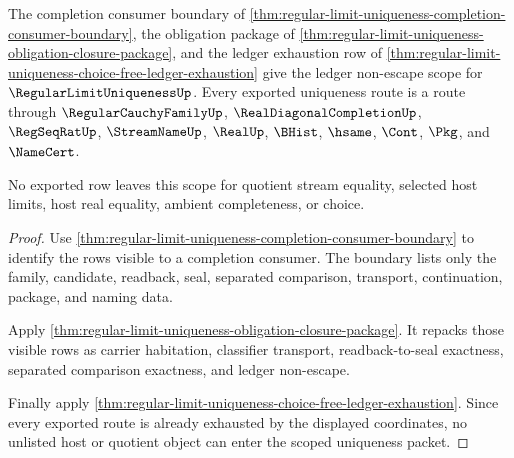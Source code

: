 \begin{theorem}
\label{thm:regular-limit-uniqueness-ledger-non-escape-scope}
The completion consumer boundary of \autoref{thm:regular-limit-uniqueness-completion-consumer-boundary}, the obligation package of \autoref{thm:regular-limit-uniqueness-obligation-closure-package}, and the ledger exhaustion row of \autoref{thm:regular-limit-uniqueness-choice-free-ledger-exhaustion} give the ledger non-escape scope for $\RegularLimitUniquenessUp$. Every exported uniqueness route is a route through $\RegularCauchyFamilyUp$, $\RealDiagonalCompletionUp$, $\RegSeqRatUp$, $\StreamNameUp$, $\RealUp$, $\BHist$, $\hsame$, $\Cont$, $\Pkg$, and $\NameCert$.

No exported row leaves this scope for quotient stream equality, selected host limits, host real equality, ambient completeness, or choice.
\end{theorem}
\begin{proof}
Use \autoref{thm:regular-limit-uniqueness-completion-consumer-boundary} to identify the rows visible to a completion consumer. The boundary lists only the family, candidate, readback, seal, separated comparison, transport, continuation, package, and naming data.

Apply \autoref{thm:regular-limit-uniqueness-obligation-closure-package}. It repacks those visible rows as carrier habitation, classifier transport, readback-to-seal exactness, separated comparison exactness, and ledger non-escape.

Finally apply \autoref{thm:regular-limit-uniqueness-choice-free-ledger-exhaustion}. Since every exported route is already exhausted by the displayed coordinates, no unlisted host or quotient object can enter the scoped uniqueness packet.
\end{proof}

